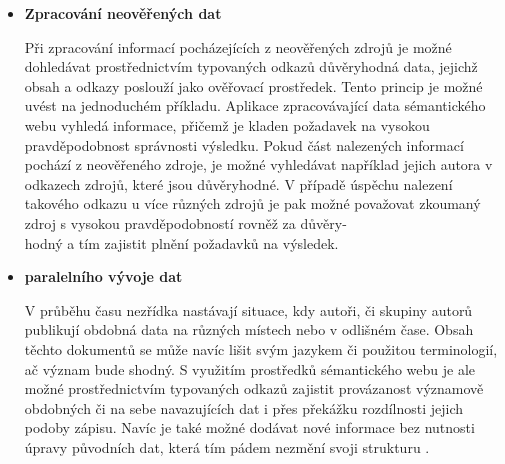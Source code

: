 \documentclass{projekt}
\begin{document}
\begin {itemize}
\item \textbf{Zpracování neověřených dat}

\hspace{0.65cm}Při zpracování informací pocházejících z neověřených zdrojů je možné dohledávat prostřednictvím typovaných odkazů důvěryhodná data, jejichž obsah a odkazy poslouží jako ověřovací prostředek. Tento princip je možné uvést na jednoduchém příkladu. Aplikace zpracovávající data sémantického webu vyhledá informace, přičemž je kladen požadavek na vysokou pravděpodobnost správnosti výsledku. Pokud část nalezených informací pochází z neověřeného zdroje, je možné vyhledávat například jejich autora v odkazech zdrojů, které jsou důvěryhodné. V případě úspěchu nalezení takového odkazu u více různých zdrojů je pak možné považovat zkoumaný zdroj s vysokou pravděpodobností rovněž za důvěry-\\hodný a tím zajistit plnění požadavků na výsledek.

\item \textbf{paralelního vývoje dat}

\hspace{0.65cm}V průběhu času nezřídka nastávají situace, kdy autoři, či skupiny autorů publikují obdobná data na různých místech nebo v odlišném čase. Obsah těchto dokumentů se může navíc lišit svým jazykem či použitou terminologií, ač význam bude shodný. S využitím prostředků sémantického webu je ale možné prostřednictvím typovaných odkazů zajistit provázanost významově obdobných či na sebe navazujících dat i přes překážku rozdílnosti jejich podoby zápisu. Navíc je také možné dodávat nové informace bez nutnosti úpravy původních dat, která tím pádem nezmění svoji strukturu \cite{_1}.

\end{itemize}
\end{document}
